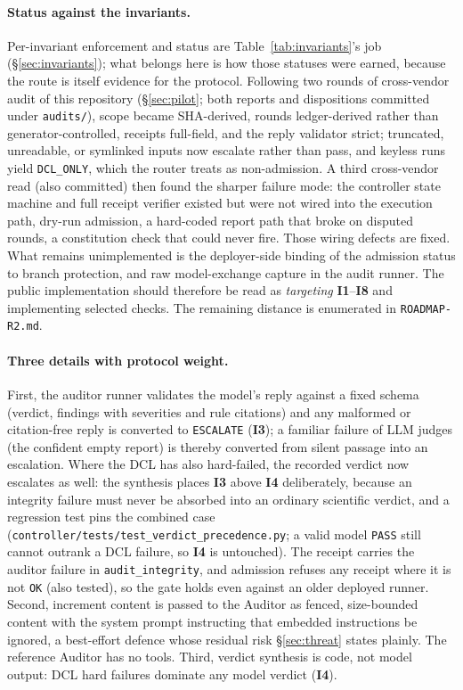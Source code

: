 \documentclass[11pt,letterpaper]{article}
\newcommand{\invariant}[1]{\textbf{I#1}}
\begin{document}
\paragraph{Status against the invariants.} Per-invariant enforcement and status are Table~\ref{tab:invariants}'s job (\S\ref{sec:invariants}); what belongs here is how those statuses were earned, because the route is itself evidence for the protocol. Following two rounds of cross-vendor audit of this repository (\S\ref{sec:pilot}; both reports and dispositions committed under \texttt{audits/}), scope became SHA-derived, rounds ledger-derived rather than generator-controlled, receipts full-field, and the reply validator strict; truncated, unreadable, or symlinked inputs now escalate rather than pass, and keyless runs yield \texttt{DCL\_ONLY}, which the router treats as non-admission. A third cross-vendor read (also committed) then found the sharper failure mode: the controller state machine and full receipt verifier existed but were not wired into the execution path, dry-run admission, a hard-coded report path that broke on disputed rounds, a constitution check that could never fire. Those wiring defects are fixed. What remains unimplemented is the deployer-side binding of the admission status to branch protection, and raw model-exchange capture in the audit runner. The public implementation should therefore be read as \emph{targeting} \invariant{1}--\invariant{8} and implementing selected checks. The remaining distance is enumerated in \texttt{ROADMAP-R2.md}. \paragraph{Three details with protocol weight.} First, the auditor runner validates the model's reply against a fixed schema (verdict, findings with severities and rule citations) and any malformed or citation-free reply is converted to \texttt{ESCALATE} (\invariant{3}); a familiar failure of LLM judges (the confident empty report) is thereby converted from silent passage into an escalation. Where the DCL has also hard-failed, the recorded verdict now escalates as well: the synthesis places \invariant{3} above \invariant{4} deliberately, because an integrity failure must never be absorbed into an ordinary scientific verdict, and a regression test pins the combined case (\texttt{controller/tests/test\_verdict\_precedence.py}; a valid model \texttt{PASS} still cannot outrank a DCL failure, so \invariant{4} is untouched). The receipt carries the auditor failure in \texttt{audit\_integrity}, and admission refuses any receipt where it is not \texttt{OK} (also tested), so the gate holds even against an older deployed runner. Second, increment content is passed to the Auditor as fenced, size-bounded content with the system prompt instructing that embedded instructions be ignored, a best-effort defence whose residual risk \S\ref{sec:threat} states plainly. The reference Auditor has no tools. Third, verdict synthesis is code, not model output: DCL hard failures dominate any model verdict (\invariant{4}).
\end{document}
